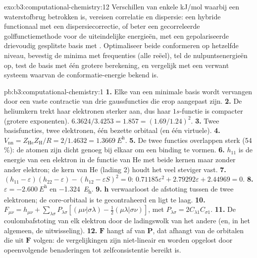 \begin{solution}{exo:b3:computational-chemistry:12}
Verschillen van enkele \unit{kJ/mol} waarbij een waterstofbrug betrokken is,
vereisen correlatie en dispersie: een hybride functionaal met een
dispersiecorrectie, of beter een gecorreleerde golffunctiemethode voor de
uiteindelijke energieën, met een gepolariseerde drievoudig gesplitste
basis met . Optimaliseer beide conformeren op
hetzelfde niveau, bevestig de minima met frequenties (alle reëel), tel de
nulpuntsenergieën op, test de basis met één grotere berekening, en
vergelijk met een verwant systeem waarvan de conformatie-energie bekend is.
\end{solution}

\begin{solution}{pb:b3:computational-chemistry:1}
\textbf{1.} Elke  van een minimale basis wordt vervangen door
een vaste contractie van drie gaussfuncties die erop aangepast zijn.
\textbf{2.} De heliumkern trekt haar elektronen sterker aan, dus haar
$1s$-functie is compacter (grotere exponenten). $6.3624/3.4253 = 1.857 = (1.69/1.24)^2$.
\textbf{3.} Twee basisfuncties, twee elektronen, één bezette orbitaal (en
één virtuele).
\textbf{4.} $V_{\mathrm{nn}} = Z_{\mathrm{He}}Z_{\mathrm H}/R = 2/1.4632 =
\qty{1.3669}{\hartree}$.
\textbf{5.} De twee functies overlappen sterk (54\,\%): de atomen zijn
dicht genoeg bij elkaar om een binding te vormen.
\textbf{6.} $h_{11}$ is de energie van een elektron in de functie van He
met beide kernen maar zonder ander elektron; de kern van He (lading 2)
houdt het veel steviger vast.
\textbf{7.} $(h_{11} - \varepsilon)(h_{22} - \varepsilon) - (h_{12} - \varepsilon S)^2 = 0$:
$0.71185\varepsilon^2 + 2.79292\varepsilon + 2.44969 = 0$.
\textbf{8.} $\varepsilon = \qty{-2.600}{\hartree}$ en \qty{-1.324}{\hartree}.
\textbf{9.} $\mathbf h$ verwaarloost de afstoting tussen de twee
elektronen; de core-orbitaal is te gecontraheerd en ligt te laag.
\textbf{10.} $F_{\mu\nu} = h_{\mu\nu} + \sum_{\lambda\sigma}P_{\lambda\sigma}[(\mu\nu|\sigma\lambda) -
\frac12(\mu\lambda|\sigma\nu)]$, met $P_{\lambda\sigma} = 2C_{\lambda1}C_{\sigma1}$.
\textbf{11.} De coulombafstoting van elk elektron door de ladingswolk van
het andere (en, in het algemeen, de uitwisseling).
\textbf{12.} $\mathbf F$ hangt af van $\mathbf P$, dat afhangt van de orbitalen
die uit $\mathbf F$ volgen: de vergelijkingen zijn niet-lineair en worden
opgelost door opeenvolgende benaderingen tot zelfconsistentie bereikt is.

\end{solution}
